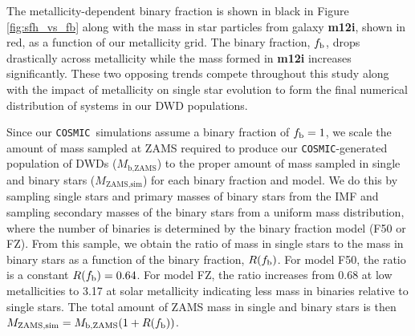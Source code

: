 \documentclass[twocolumn]{aastex631}
\newcommand{\cosmic}{\texttt{COSMIC}}
\begin{document}
The metallicity-dependent binary fraction is shown in black in Figure \ref{fig:sfh_vs_fb} along with the mass in star particles from galaxy \textbf{m12i}, shown in red, as a function of our metallicity grid. %
The binary fraction, $f_{\rm{b}}$, drops drastically across metallicity while the mass formed in \textbf{m12i} increases significantly. These two opposing trends compete throughout this study along with the impact of metallicity on single star evolution to form the final numerical distribution of systems in our DWD populations. 

Since our \cosmic\ simulations assume a binary fraction of $f_{\rm{b}} = 1$, we scale the amount of mass sampled at ZAMS required to produce our \cosmic-generated population of DWDs ($M_{\text{b,ZAMS}}$) to the proper amount of mass sampled in single and binary stars ($M_{\text{ZAMS,sim}}$) for each binary fraction and model. We do this by sampling single stars and primary masses of binary stars from the \cite{Kroupa2001} IMF and sampling secondary masses of the binary stars from a uniform mass distribution, where the number of binaries is determined by the binary fraction model (F50 or FZ). From this sample, we obtain the ratio of mass in single stars to the mass in binary stars as a function of the binary fraction, $R(f_{\rm{b}})$. For model F50, the ratio is a constant $R(f_{\rm{b}}) = 0.64$. For model FZ, the ratio increases from 0.68 at low metallicities to 3.17 at solar metallicity indicating less mass in binaries relative to single stars. The total amount of ZAMS mass in single and binary stars is then $M_{\text{ZAMS,sim}} =  M_{\text{b,ZAMS}} (1 + R(f_{\rm{b}}))$. 



\end{document}
